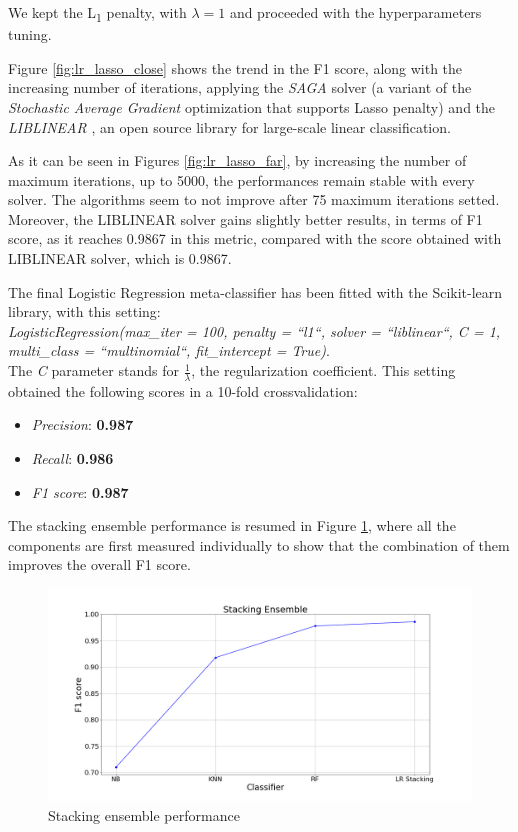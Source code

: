 We kept the L\textsubscript{1} penalty, with $ \lambda  = 1 $   and proceeded with the hyperparameters tuning.

Figure \ref{fig:lr_lasso_close} shows the trend in the F1 score, along with the increasing number of iterations, applying the \textit{SAGA} \cite{SAGA} solver (a variant of the \textit{Stochastic Average Gradient} \cite{SAG} optimization that supports Lasso penalty) and the \textit{LIBLINEAR} \cite{Liblinear}, an open source library for large-scale linear classification.

As it can be seen in Figures \ref{fig:lr_lasso_far}, by increasing the number of maximum iterations, up to 5000, the performances remain stable with every solver.
The algorithms seem to not improve after 75 maximum iterations setted.
Moreover, the LIBLINEAR solver gains slightly better results, in terms of F1 score, as it reaches 0.9867 in this metric, compared with the score obtained with LIBLINEAR solver, which is 0.9867.

The final Logistic Regression meta-classifier has been fitted with the Scikit-learn library, with this setting:\\
\textit{LogisticRegression(max\_iter = 100, penalty = ``l1``, solver = ``liblinear``, C = 1, multi\_class = ``multinomial``, fit\_intercept = True)}.\\
The \textit{C} parameter stands for $ \frac{1}{\lambda} $, the regularization coefficient.
This setting obtained the following scores in a 10-fold crossvalidation:
\begin{itemize}
	\item[\PencilRight] \textit{Precision}: \textbf{0.987}
	\item[\PencilRight] \textit{Recall}: \textbf{0.986}
	\item[\PencilRight] \textit{F1 score}: \textbf{0.987}
\end{itemize}

The stacking ensemble performance is resumed in Figure \ref{fig:stacking_performance}, where all the components are first measured individually to show that the combination of them improves the overall F1 score.
\begin{figure}[htp!]
	\includegraphics[width=\columnwidth]{chapter6/figure/stacking_performance.png}
	\caption{Stacking ensemble performance}
	\label{fig:stacking_performance}
\end{figure}

